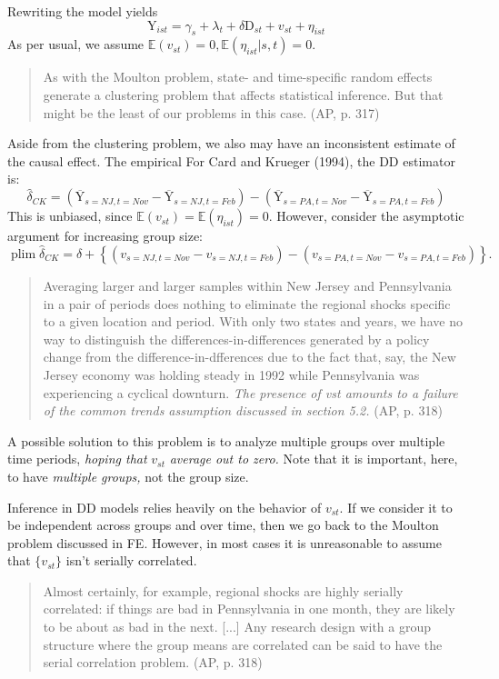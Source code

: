 \documentclass[11pt, a4paper]{report}
\theoremstyle{plain}
\theoremstyle{plain}
\theoremstyle{remark}
\begin{document}
Rewriting the model yields
\begin{equation}
    \mathrm{Y}_{i s t}=\gamma_{s}+\lambda_{t}+\delta \mathrm{D}_{s t}+v_{s t}+\eta_{i s t}
\end{equation}
As per usual, we assume $\mathbb{E}(v_{st}) = 0, \mathbb{E}(\eta_{ist} | s,t) = 0$.

\begin{quote}
    As with
    the Moulton problem, state- and time-specific random effects
    generate a clustering problem that affects statistical inference.
    But that might be the least of our problems in this case. (AP, p. 317)
\end{quote}

Aside from the clustering problem, we also may have an inconsistent estimate of the causal effect. The empirical For Card and Krueger (1994), the DD estimator is:
\begin{equation}
    \hat{\delta}_{C K}=\left(\overline{\mathrm{Y}}_{s=N J, t=N o v}-\overline{\mathrm{Y}}_{s=N J, t=F e b}\right)-\left(\overline{\mathrm{Y}}_{s=P A, t=N o v}-\overline{\mathrm{Y}}_{s=P A, t=F e b}\right)
    \end{equation}
This is unbiased, since $\mathbb{E}(v_{st}) = \mathbb{E}(\eta_{ist}) = 0.$ However, consider the asymptotic argument for increasing group size:
$$
\operatorname{plim} \hat{\delta}_{C K} =\delta+\left\{\left(v_{s=N J, t=N o v}-v_{s=N J, t=F e b}\right)-\left(v_{s=P A, t=N o v}-v_{s=P A, t=F e b}\right)\right\} .
$$
\begin{quote}
    Averaging larger and larger samples within New Jersey and
Pennsylvania in a pair of periods does nothing to eliminate
the regional shocks specific to a given location and period.
With only two states and years, we have no way to distinguish the differences-in-differences generated by a policy change from the difference-in-dfferences due to the fact that,
say, the New Jersey economy was holding steady in 1992
while Pennsylvania was experiencing a cyclical downturn. \textit{The
presence of vst amounts to a failure of the common trends
assumption discussed in section 5.2.} (AP, p. 318)
\end{quote}

A possible solution to this problem is to analyze multiple groups over multiple time periods, \textit{hoping that} $v_{st}$ \textit{average out to zero.} Note that it is important, here, to have \textit{multiple groups,} not the group size. 

Inference in DD models relies heavily on the behavior of $v_{st}$. If we consider it to be independent across groups and over time, then we go back to the Moulton problem discussed in FE. However, in most cases it is unreasonable to assume that $\{v_{st}\}$ isn't serially correlated. \begin{quote}
    Almost
certainly, for example, regional shocks are highly serially correlated: if things are bad in Pennsylvania in one month, they
are likely to be about as bad in the next. [...] Any research design with a group structure
where the group means are correlated can be said to have the
serial correlation problem. (AP, p. 318)
\end{quote}
\end{document}
